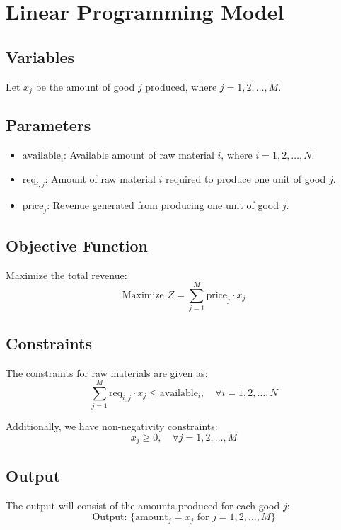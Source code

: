 \documentclass{article}
\begin{document}
\section*{Linear Programming Model}

\subsection*{Variables}
Let \( x_j \) be the amount of good \( j \) produced, where \( j = 1, 2, \ldots, M \).

\subsection*{Parameters}
\begin{itemize}
    \item \( \text{available}_i \): Available amount of raw material \( i \), where \( i = 1, 2, \ldots, N \).
    \item \( \text{req}_{i,j} \): Amount of raw material \( i \) required to produce one unit of good \( j \).
    \item \( \text{price}_j \): Revenue generated from producing one unit of good \( j \).
\end{itemize}

\subsection*{Objective Function}
Maximize the total revenue:
\[
\text{Maximize } Z = \sum_{j=1}^{M} \text{price}_j \cdot x_j
\]

\subsection*{Constraints}
The constraints for raw materials are given as:
\[
\sum_{j=1}^{M} \text{req}_{i,j} \cdot x_j \leq \text{available}_i, \quad \forall i = 1, 2, \ldots, N
\]

Additionally, we have non-negativity constraints:
\[
x_j \geq 0, \quad \forall j = 1, 2, \ldots, M
\]

\subsection*{Output}
The output will consist of the amounts produced for each good \( j \):
\[
\text{Output: } \{ \text{amount}_j = x_j \text{ for } j = 1, 2, \ldots, M \}
\]
\end{document}
